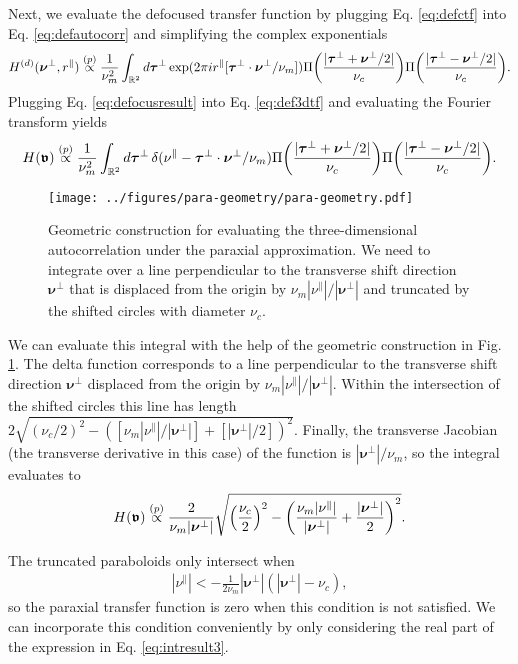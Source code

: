 \documentclass[]{osa-article}
\let\originalleft\left
\let\originalright\right
\renewcommand{\left}{\mathopen{}\mathclose\bgroup\originalleft}
\renewcommand{\right}{\aftergroup\egroup\originalright}
\newcommand{\mypar}{\parallel}
\providecommand{\mbb}[1]{\mathbb{#1}}
\providecommand{\bs}[1]{\boldsymbol{#1}}
\providecommand{\bv}{\boldsymbol{\mathfrak{v}}}
\providecommand{\bvperp}{\bs{\nu}^{\bot}}
\providecommand{\bvpar}{\nu^{\parallel}}
\providecommand{\btperp}{\bs{\tau}^{\bot}}
\providecommand{\propp}{\stackrel{(p)}{\propto}}
\begin{document}
Next, we evaluate the defocused transfer function by plugging Eq. \eqref{eq:defctf} into Eq. \eqref{eq:defautocorr} and simplifying the complex exponentials
\begin{align}
  H^{(d)}(\bvperp,r^{\mypar}) \propp \frac{1}{\nu_m^2}\int_{\mbb{R}^2}d\btperp\, \text{exp}(2\pi i r^{\mypar}[\btperp\cdot\bvperp/\nu_m])\Pi\left(\frac{|\btperp + \bvperp/2|}{\nu_c}\right) \Pi\left(\frac{|\btperp - \bvperp/2|}{\nu_c}\right).\label{eq:defocusresult}
\end{align}
Plugging Eq. \eqref{eq:defocusresult} into Eq. \eqref{eq:def3dtf} and evaluating the
Fourier transform yields 
\begin{align}
  H(\bv) \propp \frac{1}{\nu_m^2}\int_{\mbb{R}^2}d\btperp\, \delta(\bvpar - \btperp\cdot\bvperp/\nu_m)\Pi\left(\frac{|\btperp + \bvperp/2|}{\nu_c}\right) \Pi\left(\frac{|\btperp - \bvperp/2|}{\nu_c}\right).
\end{align}
\begin{figure}
  \centering
  \texttt{[image: ../figures/para-geometry/para-geometry.pdf]}
  \caption{Geometric construction for evaluating the three-dimensional autocorrelation under the paraxial approximation. We need to integrate over a line perpendicular to the transverse shift direction $\bvperp$ that is displaced from the origin by $\nu_m|\bvpar|/|\bvperp|$ and truncated by the shifted circles with diameter $\nu_c$.}
  \label{fig:geometry}
\end{figure}

We can evaluate this integral with the help of the geometric construction in Fig. \ref{fig:geometry}. The delta function corresponds to a line perpendicular to the transverse shift direction $\bvperp$ displaced from the origin by $\nu_m|\bvpar|/|\bvperp|$. Within the intersection of the shifted circles this line has length $2\sqrt{(\nu_c/2)^2 - ([\nu_m|\bvpar|/|\bvperp|] + [|\bvperp|/2])^2}$. Finally, the transverse Jacobian (the transverse derivative in this case) of the function is $|\bvperp|/\nu_m$, so the integral evaluates to 
\begin{align}
  H(\bv) \propp \frac{2}{\nu_m|\bvperp|}\sqrt{\left(\frac{\nu_c}{2}\right)^2 - \left(\frac{\nu_m|\bvpar|}{|\bvperp|} + \frac{|\bvperp|}{2}\right)^2}. \label{eq:intresult3}
\end{align}

The truncated paraboloids only intersect when
\begin{align}
  |\bvpar| < -\frac{1}{2\nu_m}|\bvperp|(|\bvperp| - \nu_c),
\end{align}
so the paraxial transfer function is zero when this condition is not satisfied. We can incorporate this condition conveniently by only considering the real part of the expression in Eq. \eqref{eq:intresult3}.
\end{document}

